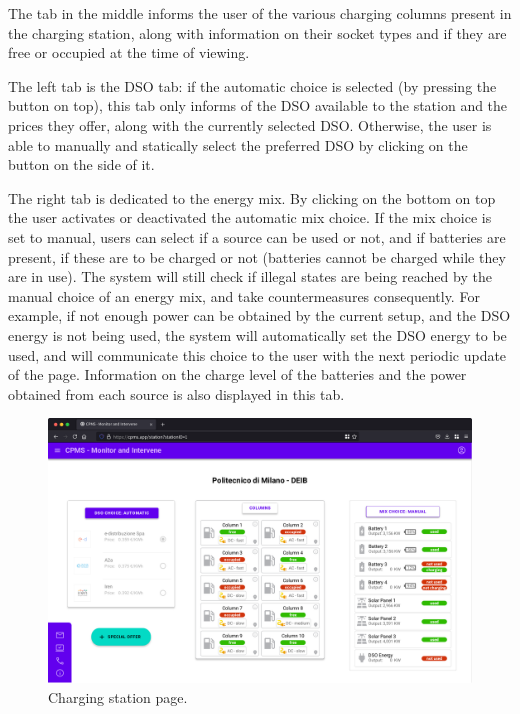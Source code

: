 The tab in the middle informs the user of the various charging columns present in the charging station, along with information on their socket types and if they are free or occupied at the time of viewing.

\medskip
The left tab is the DSO tab: if the automatic choice is selected (by pressing the button on top), this tab only informs of the DSO available to the station and the prices they offer, along with the currently selected DSO. Otherwise, the user is able to manually and statically select the preferred DSO by clicking on the button on the side of it.
\medskip

The right tab is dedicated to the energy mix. By clicking on the bottom on top the user activates or deactivated the automatic mix choice. If the mix choice is set to manual, users can select if a source can be used or not, and if batteries are present, if these are to be charged or not (batteries cannot be charged while they are in use). The system will still check if illegal states are being reached by the manual choice of an energy mix, and take countermeasures consequently. For example, if not enough power can be obtained by the current setup, and the DSO energy is not being used, the system will automatically set the DSO energy to be used, and will communicate this choice to the user with the next periodic update of the page. Information on the charge level of the batteries and the power obtained from each source is also displayed in this tab.

\bigskip
\bigskip
\bigskip
\bigskip

\begin{figure}[h!]
    \centering
    \includegraphics[width=\columnwidth]{./images/mockups/cpms/Station}
    \caption{Charging station page.}
\end{figure}

